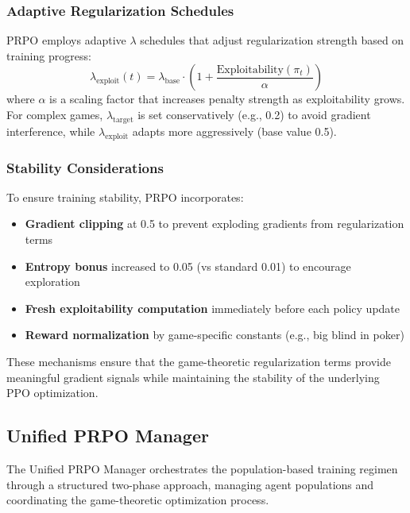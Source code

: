 \documentclass[sigconf,anonymous]{aamas}
\begin{document}
\subsubsection{Adaptive Regularization Schedules}
PRPO employs adaptive \(\lambda\) schedules that adjust regularization strength based on training progress:
\begin{equation}
\lambda_{\text{exploit}}(t) = \lambda_{\text{base}} \cdot \left(1 + \frac{\text{Exploitability}(\pi_t)}{\alpha}\right)
\end{equation}
where \(\alpha\) is a scaling factor that increases penalty strength as exploitability grows. For complex games, \(\lambda_{\text{target}}\) is set conservatively (e.g., 0.2) to avoid gradient interference, while \(\lambda_{\text{exploit}}\) adapts more aggressively (base value 0.5).

\subsubsection{Stability Considerations}
To ensure training stability, PRPO incorporates:
\begin{itemize}
\item \textbf{Gradient clipping} at 0.5 to prevent exploding gradients from regularization terms
\item \textbf{Entropy bonus} increased to 0.05 (vs standard 0.01) to encourage exploration
\item \textbf{Fresh exploitability computation} immediately before each policy update
\item \textbf{Reward normalization} by game-specific constants (e.g., big blind in poker)
\end{itemize}

These mechanisms ensure that the game-theoretic regularization terms provide meaningful gradient signals while maintaining the stability of the underlying PPO optimization.

\subsection{Unified PRPO Manager}

The Unified PRPO Manager orchestrates the population-based training regimen through a structured two-phase approach, managing agent populations and coordinating the game-theoretic optimization process.
\end{document}
